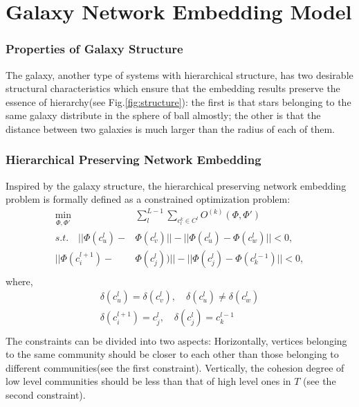 \documentclass{article}
\theoremstyle{definition}
\begin{document}
	\section{Galaxy Network Embedding Model}
	\label{sec:model}
	 \subsubsection{Properties of Galaxy Structure}
	 
	 The galaxy, another type of systems with hierarchical structure, has two desirable structural characteristics which ensure that the embedding results preserve the essence of hierarchy(see Fig.\ref{fig:structure}): the first is that stars belonging to the same galaxy distribute in the sphere of ball almostly; the other is that the distance between two galaxies is much larger than the radius of each of them.
	 
	 \subsubsection{Hierarchical Preserving Network Embedding}
	 Inspired by the galaxy structure, the hierarchical preserving network embedding problem is formally defined as a constrained optimization problem:
			\begin{equation}
			\label{equ:whole_loss}
			\begin{split}
			\min_{\Phi,\Phi'} & \sum_l^{L-1}\sum_{c^k_l \in C^l} O^{(k)}(\Phi, \Phi') \\
			s.t. \quad
			|| \Phi(c_u^l) - & \Phi(c_v^l) || - ||\Phi(c_u^l) - \Phi(c_w^l)|| < 0, \\
			|| \Phi(c_i^{l+1}) - & \Phi(c_j^{l})) || - ||\Phi(c_j^{l}) - \Phi(c_k^{l - 1})|| < 0,\\
			\end{split}
			\end{equation}
			where,
			\[
			\begin{split}
				\delta(c_u^l) = \delta(c_v^l), \quad \delta(c_u^l) \neq \delta(c_w^l)\\
				\delta(c_i^{l+1}) = c^l_j, \quad \delta(c^l_j) = c^{l - 1}_k \\ 
			\end{split}
			\]
		The constraints can be divided into two aspects: Horizontally, vertices belonging to the same community should be closer to each other than those belonging to different communities(see the first constraint). 
		Vertically, the cohesion degree of low level communities should be less than that of high level ones in $T$ (see the second constraint). 
	
\end{document}
